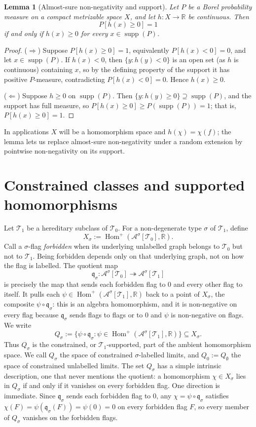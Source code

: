 \documentclass[11pt]{article}
\newtheorem{lemma}[lemma]{Lemma}
\theoremstyle{definition}
\newcommand{\R}{\mathbb{R}}
\newcommand{\A}{\mathcal{A}}
\newcommand{\T}{\mathcal{T}}
\newcommand{\Homp}{\operatorname{Hom}^{+}}
\newcommand{\supp}{\operatorname{supp}}
\newcommand{\qmap}{\mathfrak q}
\begin{document}
\begin{lemma}[Almost-sure non-negativity and support]\label{lem:support-as}
Let $P$ be a Borel probability measure on a compact metrizable space $X$, and let
$h:X\to\R$ be continuous.  Then
\[
  P[h(x)\ge0]=1
\]
if and only if $h(x)\ge0$ for every $x\in\supp(P)$.
\end{lemma}

\begin{proof}
($\Rightarrow$) Suppose $P[h(x)\ge0]=1$, equivalently $P[h(x)<0]=0$, and let
$x\in\supp(P)$.  If $h(x)<0$, then $\{y:h(y)<0\}$ is an open set (as $h$ is continuous)
containing $x$, so by the defining property of the support it has positive $P$-measure,
contradicting $P[h(x)<0]=0$.  Hence $h(x)\ge0$.

($\Leftarrow$) Suppose $h\ge0$ on $\supp(P)$.  Then
$\{y:h(y)\ge0\}\supseteq\supp(P)$, and the support has full measure, so
$P[h(x)\ge0]\ge P(\supp(P))=1$; that is, $P[h(x)\ge0]=1$.
\end{proof}

In applications $X$ will be a homomorphism space and $h(\chi)=\chi(f)$; the lemma lets us
replace almost-sure non-negativity under a random extension by pointwise non-negativity on
its support.

\section{Constrained classes and supported homomorphisms}

Let $\T_1$ be a hereditary subclass of $\T_0$.  For a non-degenerate type $\sigma$ of
$\T_1$, define
\[
  X_\sigma:=\Homp(\A^\sigma[\T_0],\R).
\]
Call a $\sigma$-flag \emph{forbidden} when its underlying unlabelled graph belongs to
$\T_0$ but not to $\T_1$.  Being forbidden depends only on
that underlying graph, not on how the flag is labelled.  The quotient map
\[
  \qmap_\sigma:\A^\sigma[\T_0]\twoheadrightarrow\A^\sigma[\T_1]
\]
is precisely the map that sends each forbidden flag to $0$ and every other flag to itself.
It pulls each $\psi\in\Homp(\A^\sigma[\T_1],\R)$ back to a point of $X_\sigma$, the composite
${\psi} \circ {\qmap_\sigma}$: this is an algebra homomorphism, and it is non-negative on every
flag because $\qmap_\sigma$ sends flags to flags or to $0$ and $\psi$ is non-negative on
flags.  We write
\[
  Q_\sigma
  :=
  \{\psi\circ\qmap_\sigma:
      \psi\in\Homp(\A^\sigma[\T_1],\R)\}
  \subseteq X_\sigma.
\]
Thus $Q_\sigma$ is the constrained, or $\T_1$-supported, part of the ambient homomorphism
space.  We call $Q_\sigma$ the space of constrained
$\sigma$-labelled limits, and $Q_0:=Q_\emptyset$ the space of constrained unlabelled
limits.  The set $Q_\sigma$ has a simple intrinsic description, one that never mentions the
quotient: a homomorphism $\chi\in X_\sigma$ lies in $Q_\sigma$ if and only if it vanishes
on every forbidden flag.  One direction is immediate.  Since $\qmap_\sigma$ sends each forbidden
flag to $0$, any $\chi=\psi\circ\qmap_\sigma$ satisfies
$\chi(F)=\psi(\qmap_\sigma(F))=\psi(0)=0$ on every forbidden flag $F$, so every member of
$Q_\sigma$ vanishes on the forbidden flags.
\end{document}
